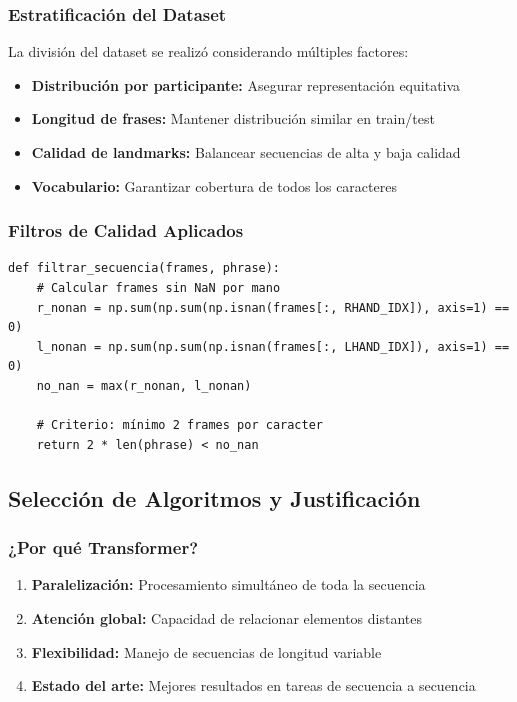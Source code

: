 \documentclass[12pt,a4paper]{article}
\begin{document}
\subsubsection{Estratificación del Dataset}
La división del dataset se realizó considerando múltiples factores:

\begin{itemize}
    \item \textbf{Distribución por participante:} Asegurar representación equitativa
    \item \textbf{Longitud de frases:} Mantener distribución similar en train/test
    \item \textbf{Calidad de landmarks:} Balancear secuencias de alta y baja calidad
    \item \textbf{Vocabulario:} Garantizar cobertura de todos los caracteres
\end{itemize}

\subsubsection{Filtros de Calidad Aplicados}
\begin{lstlisting}[style=python, caption=Criterios de filtrado de calidad]
def filtrar_secuencia(frames, phrase):
    # Calcular frames sin NaN por mano
    r_nonan = np.sum(np.sum(np.isnan(frames[:, RHAND_IDX]), axis=1) == 0)
    l_nonan = np.sum(np.sum(np.isnan(frames[:, LHAND_IDX]), axis=1) == 0)
    no_nan = max(r_nonan, l_nonan)
    
    # Criterio: mínimo 2 frames por caracter
    return 2 * len(phrase) < no_nan
\end{lstlisting}

\subsection{Selección de Algoritmos y Justificación}

\subsubsection{¿Por qué Transformer?}
\begin{enumerate}
    \item \textbf{Paralelización:} Procesamiento simultáneo de toda la secuencia
    \item \textbf{Atención global:} Capacidad de relacionar elementos distantes
    \item \textbf{Flexibilidad:} Manejo de secuencias de longitud variable
    \item \textbf{Estado del arte:} Mejores resultados en tareas de secuencia a secuencia
\end{enumerate}
\end{document}
